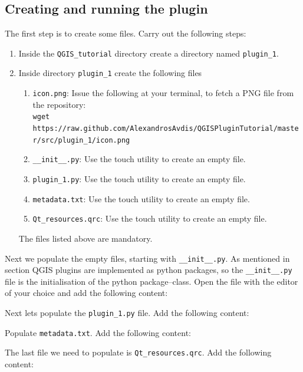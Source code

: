 \subsection{Creating and running the plugin}
\label{ssect:creating_plugin_1}
\par %
The first step is to create some files. Carry out the following steps:
\begin{enumerate}
  \item Inside the \lstinline{QGIS_tutorial} directory create a directory named \lstinline{plugin_1}.
  \item Inside directory \lstinline{plugin_1} create the following files
  \begin{enumerate}
    \item \lstinline{icon.png}: Issue the following at your terminal, to fetch a PNG file from the repository:\\ \scriptsize\verb+wget https://raw.github.com/AlexandrosAvdis/QGISPluginTutorial/master/src/plugin_1/icon.png+ \normalsize
    \item \lstinline{__init__.py}: Use the touch utility to create an empty file.
    \item \lstinline{plugin_1.py}: Use the touch utility to create an empty file.
    \item \lstinline{metadata.txt}: Use the touch utility to create an empty file.
    \item \lstinline{Qt_resources.qrc}: Use the touch utility to create an empty file.
  \end{enumerate}
  The files listed above are mandatory.
\end{enumerate}
Next we populate the empty files, starting with \lstinline{__init__.py}. As mentioned in section \label{sect:introduction} QGIS plugins are implemented as python packages, so the \lstinline{__init__.py} file is the initialisation of the python package--class. Open the file with the editor of your choice and add the following content:

\par%
Next lets populate the \lstinline{plugin_1.py} file. Add the following content:

\par%
Populate \lstinline{metadata.txt}. Add the following content:

\par%
The last file we need to populate is \lstinline{Qt_resources.qrc}. Add the following content:
